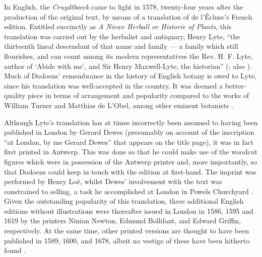 \documentclass{article}
\begin{document}
In English, the \emph{Cruydtboeck} came to light in 1578, twenty-four
years after the production of the original text, by means of a
translation of de l'Écluse's French edition. Entitled succinctly as
\emph{A Niewe Herball or Historie of Plants}, this translation was
carried out by the herbalist and antiquary, Henry Lyte, ``the thirteenth
lineal descendant of that name and family –– a family which still
flourishes, and can count among its modern representatives the Rev. H.
F. Lyte, author of `Abide with me', and Sir Henry Maxwell-Lyte, the
historian'' (\cite[125]{arber_herbals_1953}; also \cite{boulger_lyte_2004}). Much of
Dodoens' remembrance in the history of English botany is owed to Lyte,
since his translation was well-accepted in the country. It was deemed a
better-quality piece in terms of arrangement and popularity compared to the works
of William Turner and Matthias de L'Obel, among other eminent botanists
\citep[138]{barlow_old_1913}.

Although Lyte's translation has at times incorrectly been assumed to having been published in London
by Gerard Dewes (presumably on account of the inscription ``at London, by
me Gerard Dewes'' that appears on the title page), it was in fact
first printed in Antwerp. This was done so that he could make use of the woodcut
figures which were in possession of the Antwerp printer and, more
importantly, so that Dodoens could keep in touch with the edition at
first-hand. The imprint was
performed by Henry Loë, whilst Dewes' involvement with the text was
constrained to selling, a task he accomplished at London in Powels
Churchyard \citep[139--140]{barlow_old_1913}. Given the outstanding popularity of this translation, three additional
English editions without illustrations were thereafter issued in London
in 1586, 1595 and 1619 by the printers Ninian Newton, Edmund Bollifant,
and Edward Griffin, respectively. At the same time, other printed
versions are thought to have been published in 1589, 1600, and 1678,
albeit no vestige of these have been hitherto found \citep[141]{barlow_old_1913}.
\end{document}
